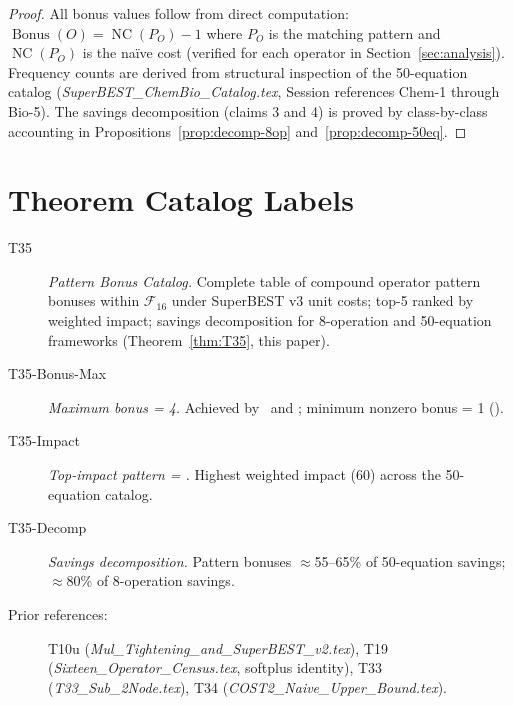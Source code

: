 \documentclass[12pt,a4paper]{article}
\theoremstyle{definition}
\newcommand{\EXL}{\operatorname{EXL}}
\newcommand{\EAL}{\operatorname{EAL}}
\newcommand{\ELSb}{\operatorname{ELSb}}
\newcommand{\LEAd}{\operatorname{LEAd}}
\newcommand{\NC}{\operatorname{NC}}
\newcommand{\Bonus}{\operatorname{Bonus}}
\begin{document}
\begin{proof}
All bonus values follow from direct computation: $\Bonus(O) = \NC(P_O) - 1$
where $P_O$ is the matching pattern and $\NC(P_O)$ is the na\"{i}ve cost
(verified for each operator in Section~\ref{sec:analysis}).
Frequency counts are derived from structural inspection of the 50-equation
catalog (\textit{SuperBEST\_ChemBio\_Catalog.tex}, Session references
Chem-1 through Bio-5).
The savings decomposition (claims 3 and 4) is proved by class-by-class
accounting in Propositions~\ref{prop:decomp-8op} and~\ref{prop:decomp-50eq}.
\end{proof}

\section*{Theorem Catalog Labels}

\begin{description}
  \item[T35] \emph{Pattern Bonus Catalog.}
        Complete table of compound operator pattern bonuses within
        $\mathcal{F}_{16}$ under SuperBEST v3 unit costs; top-5 ranked by
        weighted impact; savings decomposition for 8-operation and
        50-equation frameworks
        (Theorem~\ref{thm:T35}, this paper).
  \item[T35-Bonus-Max] \emph{Maximum bonus = 4.}
        Achieved by \LEAd\ and \EAL; minimum nonzero bonus = 1 (\ELSb).
  \item[T35-Impact] \emph{Top-impact pattern = \EXL.}
        Highest weighted impact (60) across the 50-equation catalog.
  \item[T35-Decomp] \emph{Savings decomposition.}
        Pattern bonuses $\approx$55--65\% of 50-equation savings;
        $\approx$80\% of 8-operation savings.
\end{description}

\begin{description}
  \item[Prior references:]
        T10u (\textit{Mul\_Tightening\_and\_SuperBEST\_v2.tex}),
        T19 (\textit{Sixteen\_Operator\_Census.tex}, softplus identity),
        T33 (\textit{T33\_Sub\_2Node.tex}),
        T34 (\textit{COST2\_Naive\_Upper\_Bound.tex}).
\end{description}

\end{document}
